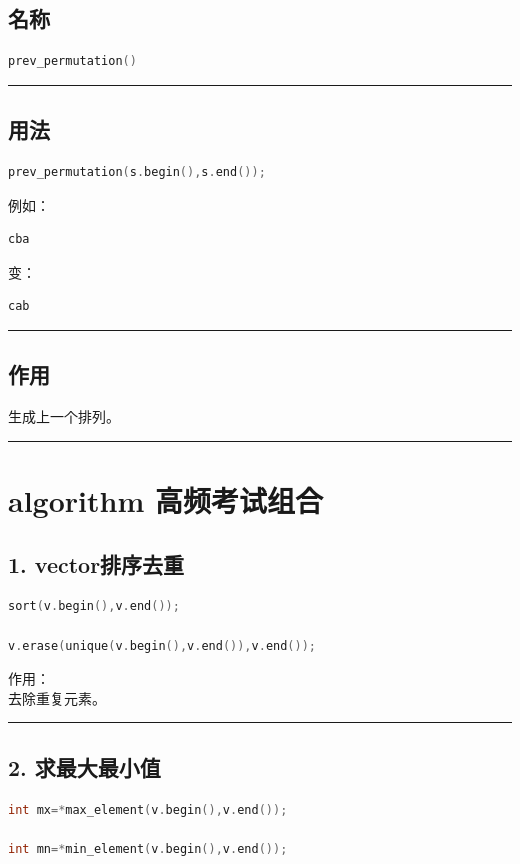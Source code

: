 \documentclass[10pt,twocolumn]{extarticle}
\begin{document}
\subsection{名称}
\begin{lstlisting}[language=C++]
prev_permutation()
\end{lstlisting}

\noindent\rule{\linewidth}{0.4pt}

\subsection{用法}
\begin{lstlisting}[language=C++]
prev_permutation(s.begin(),s.end());
\end{lstlisting}
例如：
\begin{lstlisting}
cba
\end{lstlisting}
变：
\begin{lstlisting}
cab
\end{lstlisting}

\noindent\rule{\linewidth}{0.4pt}

\subsection{作用}
生成上一个排列。

\noindent\rule{\linewidth}{0.4pt}

\section{algorithm 高频考试组合}

\subsection{1. vector排序去重}
\begin{lstlisting}[language=C++]
sort(v.begin(),v.end());

v.erase(unique(v.begin(),v.end()),v.end());
\end{lstlisting}
作用：\\
去除重复元素。

\noindent\rule{\linewidth}{0.4pt}

\subsection{2. 求最大最小值}
\begin{lstlisting}[language=C++]
int mx=*max_element(v.begin(),v.end());

int mn=*min_element(v.begin(),v.end());
\end{lstlisting}
\end{document}
